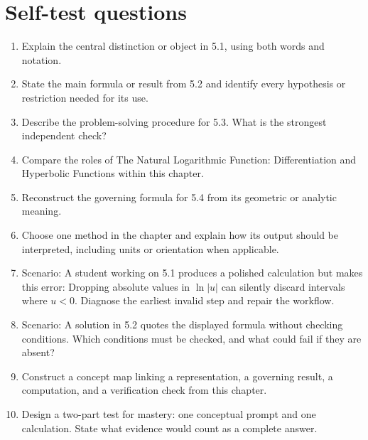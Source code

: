 \documentclass[11pt]{article}
\begin{document}
\section{Self-test questions}
\begin{enumerate}
\item Explain the central distinction or object in 5.1, using both words and notation.
\item State the main formula or result from 5.2 and identify every hypothesis or restriction needed for its use.
\item Describe the problem-solving procedure for 5.3. What is the strongest independent check?
\item Compare the roles of The Natural Logarithmic Function: Differentiation and Hyperbolic Functions within this chapter.
\item Reconstruct the governing formula for 5.4 from its geometric or analytic meaning.
\item Choose one method in the chapter and explain how its output should be interpreted, including units or orientation when applicable.
\item Scenario: A student working on 5.1 produces a polished calculation but makes this error: Dropping absolute values in $\ln|u|$ can silently discard intervals where $u<0$. Diagnose the earliest invalid step and repair the workflow.
\item Scenario: A solution in 5.2 quotes the displayed formula without checking conditions. Which conditions must be checked, and what could fail if they are absent?
\item Construct a concept map linking a representation, a governing result, a computation, and a verification check from this chapter.
\item Design a two-part test for mastery: one conceptual prompt and one calculation. State what evidence would count as a complete answer.
\end{enumerate}

\end{document}
